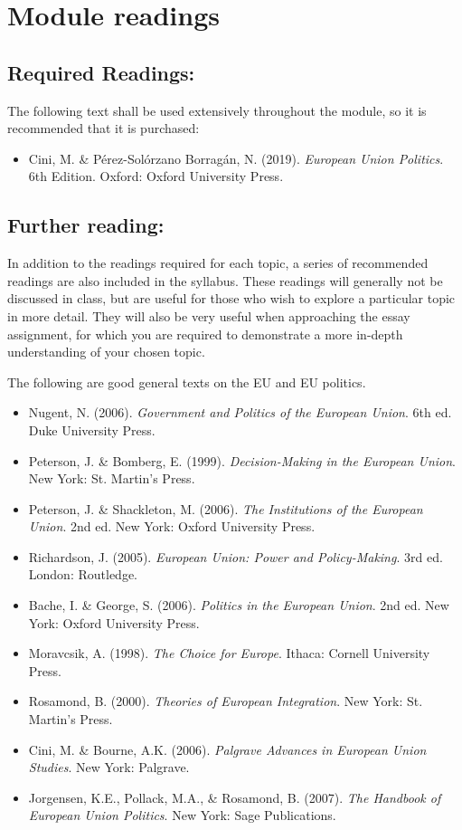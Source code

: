 
\section*{Module readings}

\subsection*{Required Readings:}

	The following text shall be used extensively throughout the module, so it is recommended that it is purchased:

\begin{itemize}
	\item Cini, M. \& P\'{e}rez-Sol\'{o}rzano Borrag\'{a}n, N. (2019). \textit{European Union Politics}. 6th Edition. Oxford: Oxford University Press.
\end{itemize}

\subsection*{Further reading:}

	In addition to the readings required for each topic, a series of recommended readings are also included in the syllabus. These readings will generally not be discussed in class, but are useful for those who wish to explore a particular topic in more detail. They will also be very useful when approaching the essay assignment, for which you are required to demonstrate a more in-depth understanding of your chosen topic. 

The following are good general texts on the EU and EU politics.

\begin{itemize}
	\item Nugent, N. (2006). \textit{Government and Politics of the European Union}. 6th ed. Duke University Press.
	\item Peterson, J. \& Bomberg, E. (1999). \textit{Decision-Making in the European Union}. New York: St. Martin’s Press.
	\item Peterson, J. \& Shackleton, M. (2006). \textit{The Institutions of the European Union}. 2nd ed. New York: Oxford University Press.
	\item Richardson, J. (2005). \textit{European Union: Power and Policy-Making}. 3rd ed. London: Routledge.
	\item Bache, I. \& George, S. (2006). \textit{Politics in the European Union}. 2nd ed. New York: Oxford University Press.
	\item Moravcsik, A. (1998). \textit{The Choice for Europe}. Ithaca: Cornell University Press.
	\item Rosamond, B. (2000). \textit{Theories of European Integration}. New York: St. Martin’s Press.
	\item Cini, M. \& Bourne, A.K. (2006). \textit{Palgrave Advances in European Union Studies}. New York: Palgrave.
	\item Jorgensen, K.E., Pollack, M.A., \& Rosamond, B. (2007). \textit{The Handbook of European Union Politics}. New York: Sage Publications.
\end{itemize}

